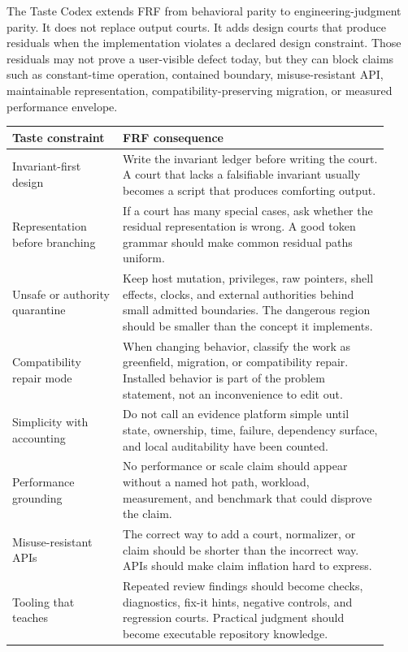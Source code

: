 \documentclass[11pt,a4paper]{article}
\newcommand{\frf}{\textsc{FRF}}
\begin{document}
The Taste Codex extends \frf{} from behavioral parity to engineering-judgment parity. It does not replace output courts. It adds design courts that produce residuals when the implementation violates a declared design constraint. Those residuals may not prove a user-visible defect today, but they can block claims such as constant-time operation, contained boundary, misuse-resistant API, maintainable representation, compatibility-preserving migration, or measured performance envelope.

\begin{longtable}{>{\raggedright\arraybackslash}p{0.27\linewidth}>{\raggedright\arraybackslash}p{0.65\linewidth}}
\toprule
\textbf{Taste constraint} & \textbf{FRF consequence} \\
\midrule
\endhead
Invariant-first design & Write the invariant ledger before writing the court. A court that lacks a falsifiable invariant usually becomes a script that produces comforting output. \\
Representation before branching & If a court has many special cases, ask whether the residual representation is wrong. A good token grammar should make common residual paths uniform. \\
Unsafe or authority quarantine & Keep host mutation, privileges, raw pointers, shell effects, clocks, and external authorities behind small admitted boundaries. The dangerous region should be smaller than the concept it implements. \\
Compatibility repair mode & When changing behavior, classify the work as greenfield, migration, or compatibility repair. Installed behavior is part of the problem statement, not an inconvenience to edit out. \\
Simplicity with accounting & Do not call an evidence platform simple until state, ownership, time, failure, dependency surface, and local auditability have been counted. \\
Performance grounding & No performance or scale claim should appear without a named hot path, workload, measurement, and benchmark that could disprove the claim. \\
Misuse-resistant APIs & The correct way to add a court, normalizer, or claim should be shorter than the incorrect way. APIs should make claim inflation hard to express. \\
Tooling that teaches & Repeated review findings should become checks, diagnostics, fix-it hints, negative controls, and regression courts. Practical judgment should become executable repository knowledge. \\
\bottomrule
\end{longtable}
\end{document}
